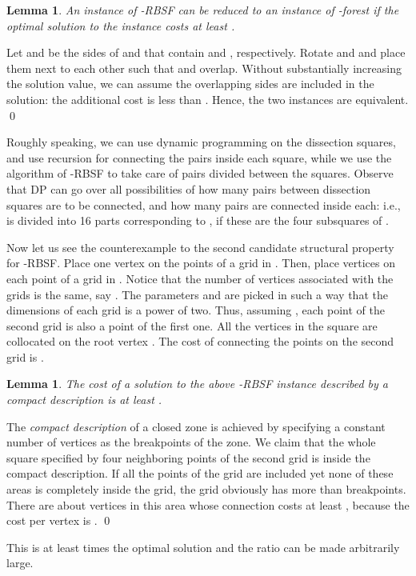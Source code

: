\documentclass[extras,11pt]{article} \usepackage{fullpage}
\theoremstyle{mytheorem}
\newtheorem{lemma}[theorem]{Lemma}
\renewenvironment{proof}{\par\noindent{\bf Proof.}\hspace{0.5em}}
    {\hfill\qed\vspace{1ex}}
\begin{document}
\begin{lemma}\label{lem:krbsf->kfor}
An instance of -RBSF can be reduced to an instance of -forest
if the optimal solution to the instance costs at least .
\end{lemma}
\begin{proof}
Let  and  be the sides of  and  that contain  and , respectively.
Rotate  and  and place them next to each other such that  and  overlap.
Without substantially increasing the solution value,
we can assume the overlapping sides are included in the  solution:
the additional cost  is less than .
Hence, the two instances are equivalent.
\end{proof}

Roughly speaking, we can use dynamic programming on the dissection squares,
and use recursion for connecting the pairs inside each square,
while we use the algorithm of -RBSF to take care of pairs
divided between the squares.
Observe that DP can go over all possibilities of how many pairs between
dissection squares are to be connected, and how many pairs are connected
inside each: i.e.,  is divided into 16 parts corresponding to ,
if these are the four subsquares of .


Now let us see the counterexample to the second candidate structural property for -RBSF.
Place one vertex on the points of a  grid in .
Then, place  vertices on each point of a  grid in .
Notice that the number of vertices associated with the grids is the same, say .
The parameters  and  are picked in such a way that the dimensions of each grid is a power of two.
Thus, assuming , each point of the second grid is also a point of the first one.
All the vertices in the square  are collocated on the root vertex .
The cost of connecting the  points on the second grid is .

\begin{lemma}\label{lem:2nd-cand}
The cost of a solution to the above -RBSF instance described by a compact description is at least .
\end{lemma}
\begin{proof}
The \emph{compact description} of a closed zone is achieved by specifying
a constant number of vertices as the breakpoints of the zone.
We claim that the whole square specified by four neighboring points of the second grid is inside the compact description.
If all the points of the grid are included yet none of these areas is completely inside the grid,
the grid obviously has more than  breakpoints.
There are about  vertices in this area whose connection costs at least ,
because the cost per vertex is .
\end{proof}

This is at least  times the optimal solution and the ratio can be made arbitrarily large.

\fi
\end{document}
